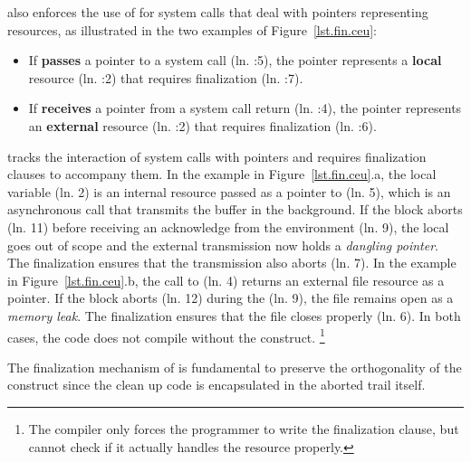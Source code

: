 \CEU also enforces the use of  for system calls that deal with
pointers representing resources, as illustrated in the two examples of
Figure~\ref{lst.fin.ceu}:
%
\begin{itemize}
\item If \CEU \textbf{passes} a pointer to a system call (ln. \ax:5), the
pointer represents a \textbf{local} resource (ln. \ax:2) that requires finalization
(ln. \ax:7).
\item If \CEU \textbf{receives} a pointer from a system call return (ln. \bx:4),
the pointer represents an \textbf{external} resource (ln. \bx:2) that requires
finalization (ln. \bx:6).
\end{itemize}
%
\CEU tracks the interaction of system calls with pointers and requires
finalization clauses to accompany them.
%
In the example in Figure~\ref{lst.fin.ceu}.a, the local variable 
(ln. 2) is an internal resource passed as a pointer to 
(ln. 5), which is an asynchronous call that transmits the buffer in the
background.
If the block aborts (ln. 11) before receiving an acknowledge from the
environment (ln. 9), the local  goes out of scope and the external
transmission now holds a \emph{dangling pointer}.
The finalization ensures that the transmission also aborts (ln. 7).
%
In the example in Figure~\ref{lst.fin.ceu}.b, the call to  (ln.
4) returns an external file resource as a pointer.
If the block aborts (ln. 12) during the  (ln. 9), the file
remains open as a \emph{memory leak}.
The finalization ensures that the file closes properly (ln. 6).
%
In both cases, the code does not compile without the 
construct.%
\footnote{
The compiler only forces the programmer to write the finalization clause, but
cannot check if it actually handles the resource properly.
}

The finalization mechanism of \CEU is fundamental to preserve the orthogonality
of the  construct since the clean up code is encapsulated in the
aborted trail itself.

